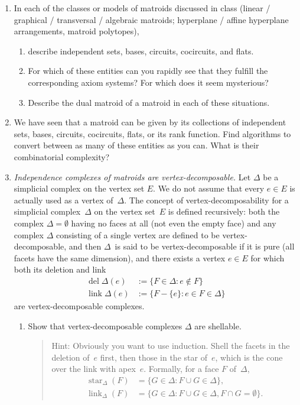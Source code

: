\documentclass[11pt]{amsart}
\DeclareMathOperator{\del}{del}
\DeclareMathOperator{\link}{link}
\DeclareMathOperator{\thestar}{star}
\newcommand{\defn}[1]{{\color{blue}#1}}
\begin{document}
\begin{enumerate}
  \bigskip
\item
  In each of the classes or models of matroids discussed in class (linear / graphical / transversal / algebraic matroids; hyperplane / affine hyperplane arrangements, matroid polytopes),
  \begin{enumerate}
  \item
    describe independent sets, bases, circuits, cocircuits, and
    flats.
  \item
    For which of these entities can you rapidly see that they
    fulfill the corresponding axiom systems?  For which does it seem
    mysterious?
  \item
    Describe the dual matroid of a matroid in each of
    these situations.
  \end{enumerate}

  \bigskip
\item
  We have seen that a matroid can be given by its collections of independent sets, bases, circuits, cocircuits, flats, or its rank function.
  Find algorithms to convert between as many of these entities as you can.
  What is their combinatorial complexity?
 
  \bigskip

\item
  \emph{Independence complexes of matroids are vertex-decomposable.}
  Let $\Delta$ be a simplicial complex on the vertex set $E$.
  We do not assume that every $e \in E$ is actually used as a vertex of~$\Delta$.
  The concept of vertex-decomposability for a simplicial complex~$\Delta$ on the vertex set~$E$ is defined recursively:
  both the complex $\Delta = \emptyset$ having no faces at all (not even the empty face)
  and any complex $\Delta$ consisting of a single vertex are defined to be \defn{vertex-decomposable},
  and then $\Delta$~is said to be \defn{vertex-decomposable} if it is pure (all facets have the same dimension),
  and there exists a vertex $e \in E$ for which both its deletion and link
  \begin{align*}
    \del \Delta (e) &:= \{F \in \Delta : e \notin F \}
    \\
    \link \Delta (e) &:= \{F - \{e\} : e \in F \in \Delta\}
  \end{align*}
  are vertex-decomposable complexes.

  \begin{enumerate}
  \item
    Show that vertex-decomposable complexes $\Delta$ are shellable.

    \begin{quote}
    \footnotesize\color{green!30!black} 
    Hint: Obviously you want to use induction.
    Shell the facets in the deletion of~$e$ first,
    then those in the star of~$e$, which is the cone over the link with apex~$e$.
    Formally, for a face $F$ of~$\Delta$,
    \begin{align*}
      \thestar_\Delta(F) &= \{ G\in\Delta: F\cup G\in\Delta\},
      \\
      \link_\Delta(F) &= \{ G\in\Delta: F\cup G\in\Delta, F\cap G=\emptyset\}.
    \end{align*}
  \end{quote}


\end{enumerate}
\end{enumerate}
\end{document}
